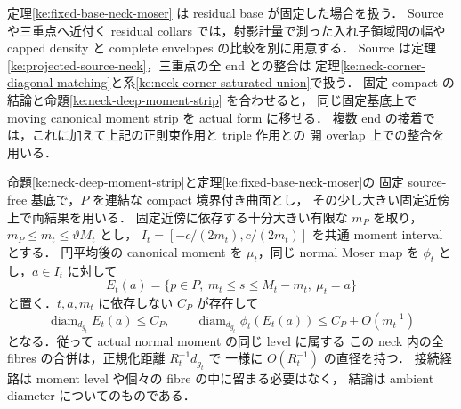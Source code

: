 定理\ref{ke:fixed-base-neck-moser} は residual base が固定した場合を扱う．
Source や三重点へ近付く residual collars では，射影計量で測った入れ子領域間の幅や
capped density と complete envelopes の比較を別に用意する．
Source は定理\ref{ke:projected-source-neck}，三重点の全 end との整合は
定理\ref{ke:neck-corner-diagonal-matching}と系\ref{ke:neck-corner-saturated-union}で扱う．
固定 compact の結論と命題\ref{ke:neck-deep-moment-strip} を合わせると，
同じ固定基底上で moving canonical moment strip を actual form に移せる．
複数 end の接着では，これに加えて上記の正則束作用と triple 作用との
開 overlap 上での整合を用いる．

\begin{proposition}
\label{ke:fixed-base-moment-connectors}
命題\ref{ke:neck-deep-moment-strip}と定理\ref{ke:fixed-base-neck-moser}の
固定 source-free 基底で，$P$ を連結な compact 境界付き曲面とし，
その少し大きい固定近傍上で両結果を用いる．
固定近傍に依存する十分大きい有限な $m_P$ を取り，
$m_P\le m_t\le\vartheta M_t$ とし，
$I_t=[-c/(2m_t),c/(2m_t)]$ を共通 moment interval とする．
円平均後の canonical moment を $\mu_t$，同じ normal Moser map を
$\phi_t$ とし，$a\in I_t$ に対して
\[
 E_t(a)=\{p\in P,\ m_t\le s\le M_t-m_t,\ \mu_t=a\}
\]
と置く．$t,a,m_t$ に依存しない $C_P$ が存在して
\begin{equation}\label{ke:eq:fixed-base-moment-connectors}
 \operatorname{diam}_{d_{g_t}}E_t(a)\le C_P,
 \qquad
 \operatorname{diam}_{d_{g_t}}\phi_t(E_t(a))
 \le C_P+O(m_t^{-1})
\end{equation}
となる．従って actual normal moment の同じ level に属する
この neck 内の全 fibres の合併は，正規化距離 $R_t^{-1}d_{g_t}$ で
一様に $O(R_t^{-1})$ の直径を持つ．
接続経路は moment level や個々の fibre の中に留まる必要はなく，
結論は ambient diameter についてのものである．
\end{proposition}

